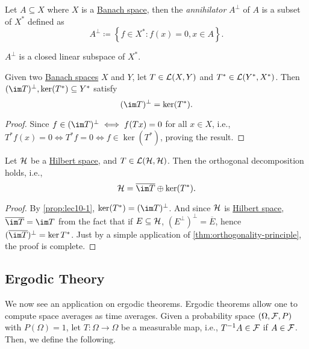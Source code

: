 \begin{definition}[Annihilator]\label{def:annihilator}
	Let \(A \subseteq X\) where \(X\) is a \hyperref[def:Banach-space]{Banach space}, then the \emph{annihilator} \(A^\perp\) of \(A\) is a subset of \(X^{\ast} \) defined as
	\[
		A^\perp \coloneqq \left\{ f\in X^{\ast} \colon f(x) = 0, x\in A \right\}.
	\]
\end{definition}

\begin{note}
	\(A^\perp\) is a closed linear subspace of \(X^{\ast} \).
\end{note}

\begin{proposition}\label{prop:lec10-1}
	Given two  \hyperref[def:Banach-space]{Banach spaces} \(X\) and \(Y\), let \(T\in \mathcal{\MakeUppercase{l}} (X, Y)\) and \(T^{\ast} \in \mathcal{\MakeUppercase{l}} (Y^{\ast} , X^{\ast} )\). Then \((\im T)^\perp, \ker (T^{\ast} ) \subseteq Y^{\ast}\) satisfy
	\[
		(\im T)^\perp = \ker (T^{\ast} ).
	\]
\end{proposition}
\begin{proof}
	Since \(f\in (\im T)^\perp \iff f(Tx)= 0\) for all \(x\in X\), i.e., \(T^{\ast} f(x) = 0 \iff T^{\ast} f = 0\iff f\in \ker(T^{\ast})\), proving the result.
\end{proof}

\begin{corollary}
	Let \(\mathcal{\MakeUppercase{h}} \) be a \hyperref[def:Hilbert-space]{Hilbert space}, and \(T\in \mathcal{\MakeUppercase{l}} (\mathcal{\MakeUppercase{h}} , \mathcal{\MakeUppercase{h}} )\). Then the orthogonal decomposition holds, i.e.,
	\[
		\mathcal{\MakeUppercase{h}} = \overline{\im T}\oplus \ker (T^{\ast} ).
	\]
\end{corollary}
\begin{proof}
	By \autoref{prop:lec10-1}, \(\ker (T^{\ast} ) = (\im T)^\perp\). And since \(\mathcal{\MakeUppercase{h}}\) is \hyperref[def:Hilbert-space]{Hilbert space}, \(\overline{\im T} = \im T\) from the fact that if \(E \subseteq \mathcal{\MakeUppercase{h}} \), \((E^\perp)^\perp = \overline{E}\), hence \((\overline{\im T})^{\perp} = \ker T^{\ast} \). Just by a simple application of \autoref{thm:orthogonality-principle}, the proof is complete.
\end{proof}

\subsection{Ergodic Theory}
We now see an application on ergodic theorems. Ergodic theorems allow one to compute space averages as time averages. Given a probability space \((\Omega , \mathcal{\MakeUppercase{f}} , P)\) with \(P(\Omega ) = 1\), let \(T\colon \Omega \to \Omega \) be a measurable map, i.e., \(T^{-1} A \in \mathcal{\MakeUppercase{f}} \) if \(A\in \mathcal{\MakeUppercase{f}} \). Then, we define the following.

